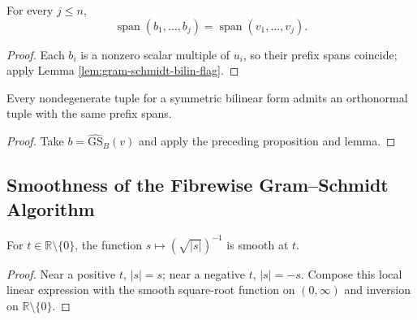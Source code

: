 \begin{lemma}
\label{lem:gram-schmidt-bilin-normed-flag}
\leanok
{}
For every $j\leq n$,
\[
\operatorname{span}(b_1,\ldots,b_j)=\operatorname{span}(v_1,\ldots,v_j).
\]
\end{lemma}

\begin{proof}
\leanok
{}
\sketch Each $b_i$ is a nonzero scalar multiple of $u_i$, so their prefix spans
coincide; apply Lemma \ref{lem:gram-schmidt-bilin-flag}.
\end{proof}

\begin{corollary}
\label{cor:gram-schmidt-bilin-recovers}
\leanok
{}
Every nondegenerate tuple for a symmetric bilinear form admits an orthonormal tuple
with the same prefix spans.
\end{corollary}

\begin{proof}
\leanok
{}
\sketch Take $b=\widehat{\mathrm{GS}}_B(v)$ and apply the preceding proposition and
lemma.
\end{proof}

\subsection{Smoothness of the Fibrewise Gram--Schmidt Algorithm}

\begin{lemma}
\label{lem:inv-sqrt-abs-smooth}
\leanok
For $t\in\mathbb R\setminus\{0\}$, the function
$s\mapsto(\sqrt{|s|})^{-1}$ is smooth at $t$.
\end{lemma}

\begin{proof}
\leanok
\sketch Near a positive $t$, $|s|=s$; near a negative $t$, $|s|=-s$. Compose
this local linear expression with the smooth square-root function on
$(0,\infty)$ and inversion on $\mathbb R\setminus\{0\}$.
\end{proof}

